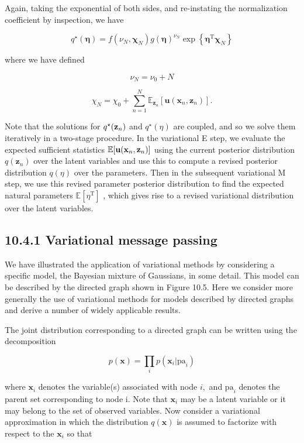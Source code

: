 \documentclass[
  10
]{article}
\begin{document}
Again, taking the exponential of both sides, and re-instating the
normalization coefficient by inspection, we have

\[
q ^ {\star} (\boldsymbol {\eta}) = f \left(\nu_ {N}, \boldsymbol {\chi} _ {N}\right) g (\boldsymbol {\eta}) ^ {\nu_ {N}} \exp \left\{\boldsymbol {\eta} ^ {\mathrm{T}} \boldsymbol {\chi} _ {N} \right\}\tag{10.119}
\]

where we have defined

\[
\nu_ {N} = \nu_ {0} + N\tag{10.120}
\]

\[
\chi_ {N} = \chi_ {0} + \sum_ {n = 1} ^ {N} \mathbb {E} _ {\mathbf {z} _ {n}} [ \mathbf {u} (\mathbf {x} _ {n}, \mathbf {z} _ {n}) ].\tag{10.121}
\]

Note that the solutions for \(q ^ { \star } ( { \bf z } _ { n } )\) and
\(q ^ { \star } ( \eta )\) are coupled, and so we solve them iteratively
in a two-stage procedure. In the variational E step, we evaluate the
expected sufficient statistics
\(\mathbb { E } [ { \bf u } ( { \bf x } _ { n } , { \bf z } _ { n } ) ]\)
using the current posterior distribution \(q ( \mathbf { z } _ { n } )\)
over the latent variables and use this to compute a revised posterior
distribution \(q ( \eta )\) over the parameters. Then in the subsequent
variational M step, we use this revised parameter posterior distribution
to find the expected natural parameters
\(\mathbb { E } [ \eta ^ { \mathrm { T } } ]\) , which gives rise to a
revised variational distribution over the latent variables.

\subsection{10.4.1 Variational message
passing}\label{variational-message-passing}

We have illustrated the application of variational methods by
considering a specific model, the Bayesian mixture of Gaussians, in some
detail. This model can be described by the directed graph shown in
Figure 10.5. Here we consider more generally the use of variational
methods for models described by directed graphs and derive a number of
widely applicable results.

The joint distribution corresponding to a directed graph can be written
using the decomposition

\[
p (\mathbf {x}) = \prod_ {i} p (\mathbf {x} _ {i} | \mathrm{pa} _ {i})\tag{10.122}
\]

where \(\mathbf { x } _ { i }\) denotes the variable(s) associated with
node \(i ,\) and \(\mathrm { p a } _ { i }\) denotes the parent set
corresponding to node i. Note that \(\mathbf { x } _ { i }\) may be a
latent variable or it may belong to the set of observed variables. Now
consider a variational approximation in which the distribution
\(q ( \mathbf { x } )\) is assumed to factorize with respect to the
\(\mathbf { x } _ { i }\) so that
\end{document}
